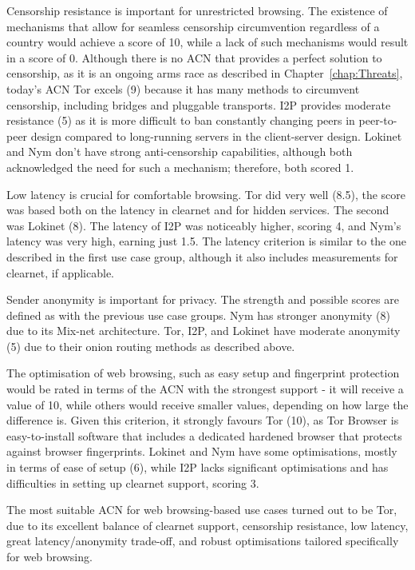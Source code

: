 Censorship resistance is important for unrestricted browsing. The existence of mechanisms that allow for seamless censorship circumvention regardless of a country would achieve a score of 10, while a lack of such mechanisms would result in a score of 0. Although there is no ACN that provides a perfect solution to censorship, as it is an ongoing arms race as described in Chapter~\ref{chap:Threats}, today's ACN Tor excels (9) because it has many methods to circumvent censorship, including bridges and pluggable transports. I2P provides moderate resistance (5) as it is more difficult to ban constantly changing peers in peer-to-peer design compared to long-running servers in the client-server design. Lokinet and Nym don't have strong anti-censorship capabilities, although both acknowledged the need for such a mechanism; therefore, both scored 1.

Low latency is crucial for comfortable browsing. Tor did very well (8.5), the score was based both on the latency in clearnet and for hidden services. The second was Lokinet (8). The latency of I2P was noticeably higher, scoring 4, and Nym’s latency was very high, earning just 1.5. The latency criterion is similar to the one described in the first use case group, although it also includes measurements for clearnet, if applicable.

Sender anonymity is important for privacy. The strength and possible scores are defined as with the previous use case groups. Nym has stronger anonymity (8) due to its Mix-net architecture. Tor, I2P, and Lokinet have moderate anonymity (5) due to their onion routing methods as described above.

The optimisation of web browsing, such as easy setup and fingerprint protection would be rated in terms of the ACN with the strongest support - it will receive a value of 10, while others would receive smaller values, depending on how large the difference is. Given this criterion, it strongly favours Tor (10), as Tor Browser is easy-to-install software that includes a dedicated hardened browser that protects against browser fingerprints. Lokinet and Nym have some optimisations, mostly in terms of ease of setup (6), while I2P lacks significant optimisations and has difficulties in setting up clearnet support, scoring 3.

The most suitable ACN for web browsing-based use cases turned out to be Tor, due to its excellent balance of clearnet support, censorship resistance, low latency, great latency/anonymity trade-off, and robust optimisations tailored specifically for web browsing. 

